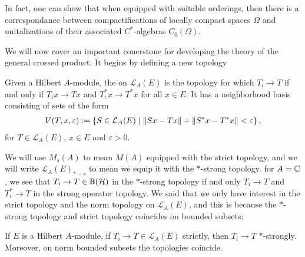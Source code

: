 In fact, one can show that when equipped with suitable orderings, then there is a correspondance between compactifications of locally compact spaces $\Omega$ and unitalizations of their associated $C^*$-algebras $C_0(\Omega)$.

We will now cover an important conerstone for developing the theory of the general crossed product. It begins by defining a new topology
\begin{definition}
	Given a Hilbert $A$-module, the  on $\mathcal{L}_A(E)$ is the topology for which $T_i \to T$ if and only if $T_i x \to Tx$ and $T_i^* x \to T^*x$ for all $x \in E$. It has a neighborhood basis consisting of sets of the form
	\begin{align*}
		V(T,x,\varepsilon) := \left\{ S \in \mathcal{L}_A(E) \mid \left\lVert Sx-Tx\right\rVert + \left\lVert S^*x - T^*x\right\rVert < \varepsilon \right\},
	\end{align*}
	for $T \in \mathcal{L}_A(E)$, $x \in E$ and $ \varepsilon > 0$.
\end{definition}
We will use $M_s(A)$ to mean $M(A)$ equipped with the strict topology, and we will write $\mathcal{L}_A(E)_{*-s}$ to mean we equip it with the $*$-strong topology. for $A=\mathbb{C}$, we see that $T_i \to T \in \mathbb{B}(\mathcal{H})$ in the $*$-strong topology if and only $T_i \to T$ and $T_i^* \to T$ in the strong operator topology. We said that we only have interest in the strict topology and the norm topology on $\mathcal{L}_A(E)$, and this is because the $*$-strong topology and strict topology coincides on bounded subsets:
\begin{proposition}
	If $E$ is a Hilbert $A$-module, if $T_i \to T \in \mathcal{L}_A(E)$ strictly, then $T_i \to T$ $*$-strongly. Moreover, on norm bounded subsets the topologies coincide.
	\label{mult:STARTSTRONG}
\end{proposition}
